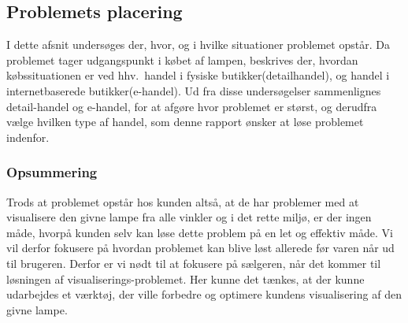 \subsection{Problemets placering}
I dette afsnit undersøges der, hvor, og i hvilke situationer problemet opstår. Da problemet tager udgangspunkt i købet af lampen, beskrives der, hvordan købssituationen er ved hhv.\ handel i fysiske butikker(detailhandel), og handel i internetbaserede butikker(e-handel). Ud fra disse undersøgelser sammenlignes detail-handel og e-handel, for at afgøre hvor problemet er størst, og derudfra vælge hvilken type af handel, som denne rapport ønsker at løse problemet indenfor.







\subsubsection*{Opsummering}
Trods at problemet opstår hos kunden altså, at de har problemer med at visualisere den givne lampe fra alle vinkler og i det rette miljø, er der ingen måde, hvorpå kunden selv kan løse dette problem på en let og effektiv måde. Vi vil derfor fokusere på hvordan problemet kan blive løst allerede før varen når ud til brugeren. Derfor er vi nødt til at fokusere på sælgeren, når det kommer til løsningen af visualiserings-problemet. Her kunne det tænkes, at der kunne udarbejdes et værktøj, der ville forbedre og optimere kundens visualisering af den givne lampe.

